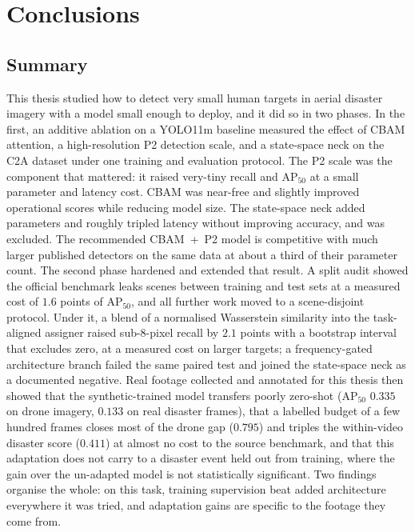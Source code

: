 \chapter{Conclusions}

\section{Summary}
This thesis studied how to detect very small human targets in aerial disaster
imagery with a model small enough to deploy, and it did so in two phases. In the
first, an additive ablation on a YOLO11m baseline measured the effect of CBAM
attention, a high-resolution P2 detection scale, and a state-space neck on the
C2A dataset under one training and evaluation protocol. The P2 scale was the
component that mattered: it raised very-tiny recall and $\mathrm{AP}_{50}$ at a
small parameter and latency cost. CBAM was near-free and slightly improved
operational scores while reducing model size. The state-space neck added
parameters and roughly tripled latency without improving accuracy, and was
excluded. The recommended CBAM~+~P2 model is competitive with much larger
published detectors on the same data at about a third of their parameter count.
The second phase hardened and extended that result. A split audit showed the
official benchmark leaks scenes between training and test sets at a measured
cost of $1.6$ points of $\mathrm{AP}_{50}$, and all further work moved to a
scene-disjoint protocol. Under it, a blend of a normalised Wasserstein
similarity into the task-aligned assigner raised sub-8-pixel recall by $2.1$
points with a bootstrap interval that excludes zero, at a measured cost on
larger targets; a frequency-gated architecture branch failed the same paired
test and joined the state-space neck as a documented negative. Real footage
collected and annotated for this thesis then showed that the synthetic-trained
model transfers poorly zero-shot ($\mathrm{AP}_{50}$ $0.335$ on drone imagery,
$0.133$ on real disaster frames), that a labelled budget of a few hundred frames
closes most of the drone gap ($0.795$) and triples the within-video disaster
score ($0.411$) at almost no cost to the source benchmark, and that this
adaptation does not carry to a disaster event held out from training, where the
gain over the un-adapted model is not statistically significant. Two findings
organise the whole: on this task, training supervision beat added architecture
everywhere it was tried, and adaptation gains are specific to the footage they
come from.

